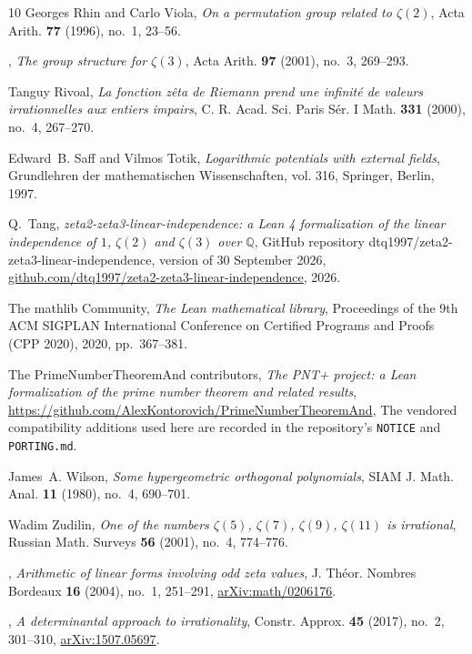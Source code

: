 \documentclass[11pt]{amsart}
\theoremstyle{definition}
\theoremstyle{remark}
\numberwithin{equation}{section}
\begin{document}
\begin{thebibliography}{10}
Georges Rhin and Carlo Viola, \emph{On a permutation group related to
  {$\zeta(2)$}}, Acta Arith. \textbf{77} (1996), no.~1, 23--56.

\bysame, \emph{The group structure for {$\zeta(3)$}}, Acta Arith. \textbf{97}
  (2001), no.~3, 269--293.

Tanguy Rivoal, \emph{La fonction z\^eta de {R}iemann prend une infinit\'e de
  valeurs irrationnelles aux entiers impairs}, C. R. Acad. Sci. Paris S\'er. I
  Math. \textbf{331} (2000), no.~4, 267--270.

Edward~B. Saff and Vilmos Totik, \emph{Logarithmic potentials with external
  fields}, Grundlehren der mathematischen Wissenschaften, vol. 316, Springer,
  Berlin, 1997.

Q.~Tang, \emph{zeta2-zeta3-linear-independence: a {L}ean 4 formalization of the
  linear independence of {$1$}, {$\zeta(2)$} and {$\zeta(3)$} over
  {$\mathbb{Q}$}}, GitHub repository dtq1997/zeta2-zeta3-linear-independence,
  version of 30 September 2026,
  \href{https://github.com/dtq1997/zeta2-zeta3-linear-independence}{github.com/dtq1997/zeta2-zeta3-linear-independence},
  2026.

{The mathlib Community}, \emph{The {L}ean mathematical library}, Proceedings of
  the 9th ACM SIGPLAN International Conference on Certified Programs and Proofs
  (CPP 2020), 2020, pp.~367--381.

{The PrimeNumberTheoremAnd contributors}, \emph{The {PNT+} project: a {L}ean
  formalization of the prime number theorem and related results},
  \url{https://github.com/AlexKontorovich/PrimeNumberTheoremAnd}, The vendored
  compatibility additions used here are recorded in the repository's
  \texttt{NOTICE} and \texttt{PORTING.md}.

James~A. Wilson, \emph{Some hypergeometric orthogonal polynomials}, SIAM J.
  Math. Anal. \textbf{11} (1980), no.~4, 690--701.

Wadim Zudilin, \emph{One of the numbers {$\zeta(5)$}, {$\zeta(7)$},
  {$\zeta(9)$}, {$\zeta(11)$} is irrational}, Russian Math. Surveys \textbf{56}
  (2001), no.~4, 774--776.

\bysame, \emph{Arithmetic of linear forms involving odd zeta values}, J.
  Th\'eor. Nombres Bordeaux \textbf{16} (2004), no.~1, 251--291,
  \href{https://arxiv.org/abs/math/0206176}{arXiv:math/0206176}.

\bysame, \emph{A determinantal approach to irrationality}, Constr. Approx.
  \textbf{45} (2017), no.~2, 301--310,
  \href{https://arxiv.org/abs/1507.05697}{arXiv:1507.05697}.

\end{thebibliography}
\end{document}
